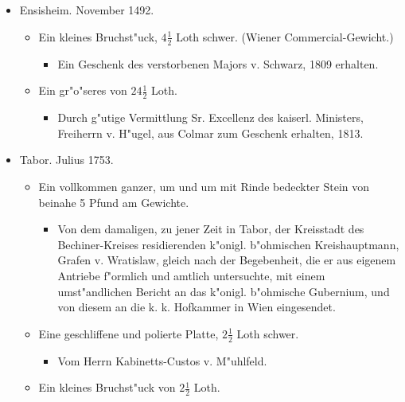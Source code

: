 \documentclass[a4paper, 11pt, oneside, polutonikogreek, german]{article}
\begin{document}
\subsection{}
\begin{itemize}
    \item Ensisheim. November 1492.
    \begin{itemize}
        \item Ein kleines Bruchst"uck, $\mathfrak{4\frac{1}{2}}$ Loth schwer. (Wiener Commercial-Gewicht.)
        \begin{itemize}
            \item Ein Geschenk des verstorbenen Majors v. Schwarz, 1809 erhalten.
        \end{itemize}
        \item Ein gr"o"seres von $\mathfrak{24\frac{1}{2}}$ Loth.
        \begin{itemize}
            \item Durch g"utige Vermittlung Sr. Excellenz des kaiserl. Ministers, Freiherrn v. H"ugel, aus Colmar zum Geschenk erhalten, 1813.
        \end{itemize}
    \end{itemize}
    \item Tabor. Julius 1753.
    \begin{itemize}
        \item Ein vollkommen ganzer, um und um mit Rinde bedeckter Stein von beinahe 5 Pfund am Gewichte.
        \begin{itemize}
            \item Von dem damaligen, zu jener Zeit in Tabor, der Kreisstadt des Bechiner-Kreises residierenden k"onigl. b"ohmischen Kreishauptmann, Grafen v. Wratislaw, gleich nach der Begebenheit, die er aus eigenem Antriebe f"ormlich und amtlich untersuchte, mit einem umst"andlichen Bericht an das k"onigl. b"ohmische Gubernium, und von diesem an die k. k. Hofkammer in Wien eingesendet.
        \end{itemize}
        \item Eine geschliffene und polierte Platte, $\mathfrak{2\frac{1}{2}}$ Loth schwer.
        \begin{itemize}
            \item Vom Herrn Kabinetts-Custos v. M"uhlfeld.
        \end{itemize}
        \item Ein kleines Bruchst"uck von $\mathfrak{2\frac{1}{2}}$ Loth.
        \begin{itemize}

\end{itemize}
\end{itemize}
\end{itemize}
\end{document}
